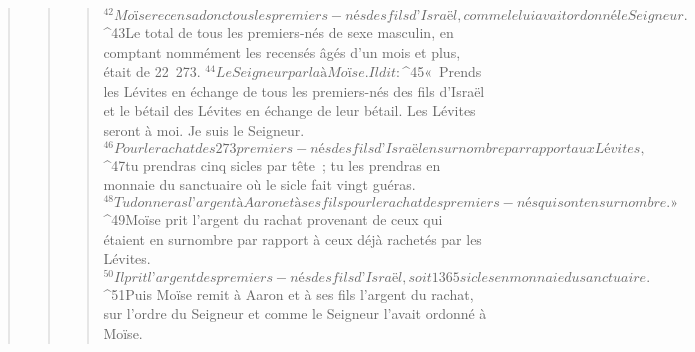 \begin{verse}
\begin{verse}
\begin{verse}
${}^{42}Moïse recensa donc tous les premiers-nés des fils d’Israël, comme le lui avait ordonné le Seigneur. 
${}^{43}Le total de tous les premiers-nés de sexe masculin, en comptant nommément les recensés âgés d’un mois et plus, était de 22 273.
${}^{44}Le Seigneur parla à Moïse. Il dit : 
${}^{45}« Prends les Lévites en échange de tous les premiers-nés des fils d’Israël et le bétail des Lévites en échange de leur bétail. Les Lévites seront à moi. Je suis le Seigneur. 
${}^{46}Pour le rachat des 273 premiers-nés des fils d’Israël en surnombre par rapport aux Lévites, 
${}^{47}tu prendras cinq sicles par tête ; tu les prendras en monnaie du sanctuaire où le sicle fait vingt guéras. 
${}^{48}Tu donneras l’argent à Aaron et à ses fils pour le rachat des premiers-nés qui sont en surnombre. » 
${}^{49}Moïse prit l’argent du rachat provenant de ceux qui étaient en surnombre par rapport à ceux déjà rachetés par les Lévites. 
${}^{50}Il prit l’argent des premiers-nés des fils d’Israël, soit 1 365 sicles en monnaie du sanctuaire. 
${}^{51}Puis Moïse remit à Aaron et à ses fils l’argent du rachat, sur l’ordre du Seigneur et comme le Seigneur l’avait ordonné à Moïse.
      

\end{verse}
\end{verse}
\end{verse}
